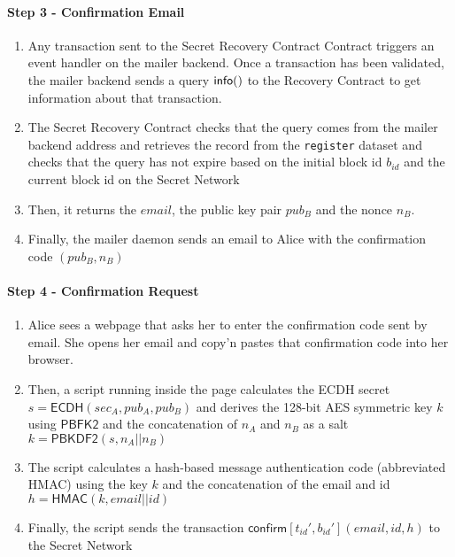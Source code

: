 \documentclass[12pt]{article}
\newcommand{\ms}[1]{\ensuremath{\mathsf{#1}}}
\newcommand{\tx}[3]{\ms{#1}[#2](#3)}
\newcommand{\qry}[3]{\ms{#1}(#3)}
\begin{document}
\paragraph{Step 3 - Confirmation Email}

\begin{enumerate}[label=3.\arabic*]
  \item Any transaction sent to the Secret Recovery Contract Contract triggers an event handler on the mailer backend. Once a transaction has been validated, the mailer backend sends a query $\qry{info}{t_id}$ to the Recovery Contract to get information about that transaction.
  \item The Secret Recovery Contract checks that the query comes from the mailer backend address and retrieves the record from the {\tt register} dataset and checks that the query has not expire based on the initial block id $b_{id}$ and the current block id on the Secret Network
  \item Then, it returns the $email$, the public key pair $pub_B$ and the nonce $n_B$.
  \item Finally, the mailer daemon sends an email to Alice with the confirmation code $(pub_B, n_B)$
\end{enumerate}

\paragraph{Step 4 - Confirmation Request}

\begin{enumerate}[label=4.\arabic*]
  \item Alice sees a webpage that asks her to enter the confirmation code sent by email. She opens her email and copy'n pastes that confirmation code into her browser. 
  \item Then, a script running inside the page calculates the ECDH secret $s=\ms{ECDH}(sec_A, pub_A, pub_B)$ and derives the 128-bit AES symmetric key $k$ using $\ms{PBFK2}$ and the concatenation of $n_A$ and $n_B$ as a salt $k=\ms{PBKDF2}(s, n_A || n_B)$
  \item The script calculates a hash-based message authentication code (abbreviated HMAC) using the key $k$ and the concatenation of the email and id $h=\ms{HMAC}(k, email || id)$
  \item Finally, the script sends the transaction $\tx{confirm}{t_{id}', b_{id}'}{email, id, h}$ to the Secret Network
\end{enumerate}
\end{document}
